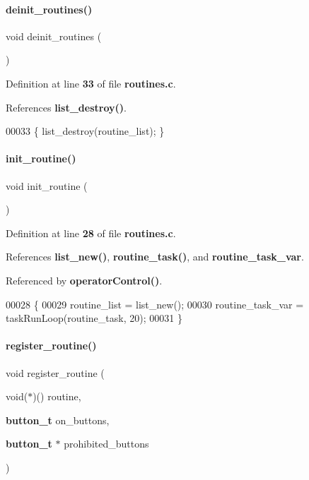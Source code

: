 \paragraph{deinit\+\_\+routines()}
{\footnotesize\ttfamily void deinit\+\_\+routines (\begin{DoxyParamCaption}{ }\end{DoxyParamCaption})}



Definition at line \textbf{ 33} of file \textbf{ routines.\+c}.



References \textbf{ list\+\_\+destroy()}.


\begin{DoxyCode}
00033 \{ list_destroy(routine_list); \}
\end{DoxyCode}
\mbox{\label{a00140_ab873e24fcc59a2bf7844618b664a5d26}} 
\paragraph{init\+\_\+routine()}
{\footnotesize\ttfamily void init\+\_\+routine (\begin{DoxyParamCaption}{ }\end{DoxyParamCaption})}



Definition at line \textbf{ 28} of file \textbf{ routines.\+c}.



References \textbf{ list\+\_\+new()}, \textbf{ routine\+\_\+task()}, and \textbf{ routine\+\_\+task\+\_\+var}.



Referenced by \textbf{ operator\+Control()}.


\begin{DoxyCode}
00028                     \{
00029   routine_list = list_new();
00030   routine_task_var = taskRunLoop(routine_task, 20);
00031 \}
\end{DoxyCode}
\mbox{\label{a00140_a4bf3e235fcde5f0e1ce1f693cbb9c01c}} 
\paragraph{register\+\_\+routine()}
{\footnotesize\ttfamily void register\+\_\+routine (\begin{DoxyParamCaption}\item[{void($\ast$)()}]{routine,  }\item[{\textbf{ button\+\_\+t}}]{on\+\_\+buttons,  }\item[{\textbf{ button\+\_\+t} $\ast$}]{prohibited\+\_\+buttons }\end{DoxyParamCaption})}



